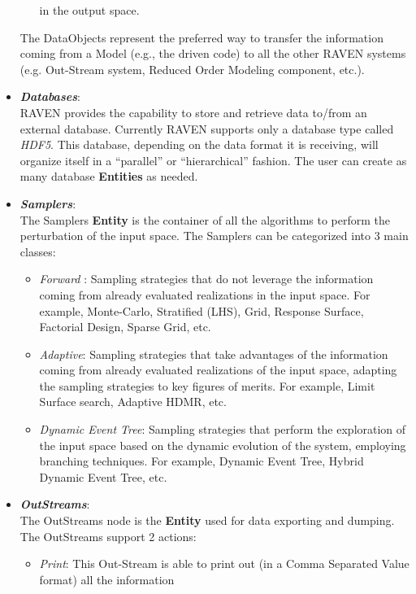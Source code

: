 \begin{itemize}
\begin{itemize}
                                               in the output space.
     \end{itemize}
     The DataObjects represent the preferred way to transfer the information coming from a Model (e.g., the driven code) to
      all the other RAVEN systems (e.g. Out-Stream system, Reduced Order Modeling component, etc.).
  \item \textit{\textbf{Databases}}:
      \\ RAVEN provides the capability to store and retrieve data to/from an external database. Currently RAVEN supports
       only a database type called \textit{HDF5}. This database, depending on the data format it is receiving, will
       organize itself in a ``parallel'' or ``hierarchical'' fashion. The user can create as many database \textbf{Entities} as needed.
  \item \textit{\textbf{Samplers}}:
  \\ The Samplers  \textbf{Entity} is the container of all the algorithms to perform the perturbation of the input space.
      The Samplers can be categorized into 3 main classes:
      \begin{itemize}
        \item  \textit{Forward} : Sampling strategies that do not leverage the information coming from already evaluated
        realizations in the input space. For example, Monte-Carlo, Stratified (LHS), Grid, Response Surface, Factorial Design,
        Sparse Grid, etc.
        \item  \textit{Adaptive}:  Sampling strategies that take advantages of the information coming from already evaluated
        realizations of the input space, adapting the sampling strategies to key figures of merits. For example, Limit Surface
        search, Adaptive HDMR, etc.
        \item \textit{Dynamic Event Tree}: Sampling strategies that perform the exploration of the input space based on the
        dynamic evolution of the system, employing branching techniques. For example, Dynamic Event Tree, Hybrid
        Dynamic Event Tree, etc.
      \end{itemize}
  \item \textit{\textbf{OutStreams}}:
  \\ The OutStreams node is the \textbf{Entity} used  for data exporting and dumping. The OutStreams support
   2 actions:
      \begin{itemize}
       \item \textit{Print}: This Out-Stream is able to print out (in a Comma Separated Value format) all the information

\end{itemize}
\end{itemize}
